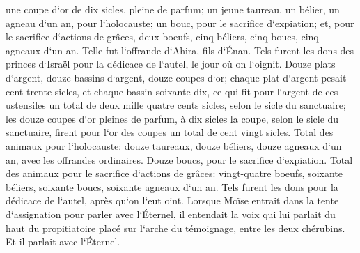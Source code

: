 \verse une coupe d`or de dix sicles, pleine de parfum; 
\verse un jeune taureau, un bélier, un agneau d`un an, pour l`holocauste; 
\verse un bouc, pour le sacrifice d`expiation; 
\verse et, pour le sacrifice d`actions de grâces, deux boeufs, cinq béliers, cinq boucs, cinq agneaux d`un an. Telle fut l`offrande d`Ahira, fils d`Énan. 
\verse Tels furent les dons des princes d`Israël pour la dédicace de l`autel, le jour où on l`oignit. Douze plats d`argent, douze bassins d`argent, douze coupes d`or; 
\verse chaque plat d`argent pesait cent trente sicles, et chaque bassin soixante-dix, ce qui fit pour l`argent de ces ustensiles un total de deux mille quatre cents sicles, selon le sicle du sanctuaire; 
\verse les douze coupes d`or pleines de parfum, à dix sicles la coupe, selon le sicle du sanctuaire, firent pour l`or des coupes un total de cent vingt sicles. 
\verse Total des animaux pour l`holocauste: douze taureaux, douze béliers, douze agneaux d`un an, avec les offrandes ordinaires. Douze boucs, pour le sacrifice d`expiation. 
\verse Total des animaux pour le sacrifice d`actions de grâces: vingt-quatre boeufs, soixante béliers, soixante boucs, soixante agneaux d`un an. Tels furent les dons pour la dédicace de l`autel, après qu`on l`eut oint. 
\verse Lorsque Moïse entrait dans la tente d`assignation pour parler avec l`Éternel, il entendait la voix qui lui parlait du haut du propitiatoire placé sur l`arche du témoignage, entre les deux chérubins. Et il parlait avec l`Éternel. 


